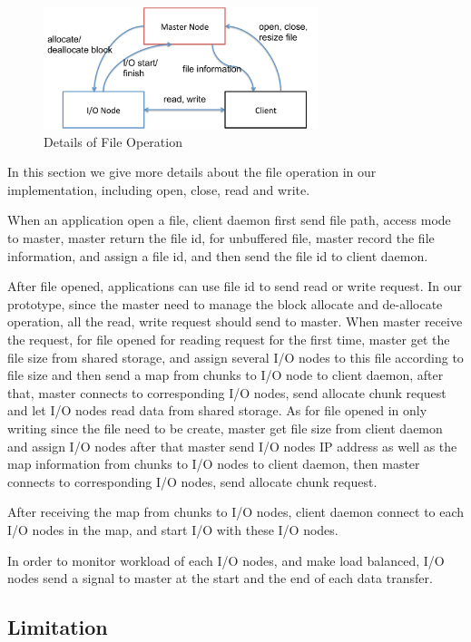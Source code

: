\begin{figure}
\centering
\includegraphics[width=8cm]{img/file_operation}
\caption{Details of File Operation}
\label{implementation:file operation}
\end{figure}

In this section we give more details about the file operation in our implementation, including
open, close, read and write.

When an application open a file, client daemon first send file path, access mode to master,
master return the file id,
for unbuffered file, master record the file information, and assign a file id, and then send the
file id to client daemon.

After file opened, applications can use file id to send read or write request.
In our prototype, since the master need to manage the block allocate and de-allocate operation, all
the read, write request should send to master.
When master receive the request, for file opened for reading
request for the first time, master get the file size from shared storage, and assign several I/O
nodes to this file according to file size and then send a map from chunks to I/O node to client
daemon, after that, master connects to corresponding I/O nodes, send allocate chunk request and
let I/O nodes read data from shared storage.
As for file opened in only writing since the file need to be create, master get file size from
client daemon and assign I/O nodes after that master send I/O nodes IP address as well as the map
information from chunks to I/O nodes to client daemon, then master connects to corresponding I/O
nodes, send allocate chunk request.

After receiving the map from chunks to I/O nodes, client daemon connect to each I/O
nodes in the map, and start I/O with these I/O nodes.

In order to monitor workload of each I/O nodes, and make load balanced, I/O nodes send a signal to
master at the start and the end of each data transfer.

\subsection{Limitation}

